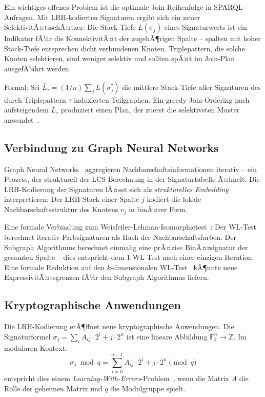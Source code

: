 ﻿\documentclass[a4paper,12pt]{article}
\theoremstyle{definition}
\begin{document}
Ein wichtiges offenes Problem ist die optimale Join-Reihenfolge in SPARQL-Anfragen.
Mit LRH-kodierten Signaturen ergibt sich ein neuer SelektivitÃ¤tsschÃ¤tzer: Die
Stack-Tiefe $L(\sigma_j)$ eines Signaturwerts ist ein Indikator fÃ¼r die KonnektivitÃ¤t
der zugehÃ¶rigen Spalte -- spalten mit hoher Stack-Tiefe entsprechen dicht verbundenen
Knoten. Triplepattern, die solche Knoten selektieren, sind weniger selektiv und
sollten spÃ¤t im Join-Plan ausgefÃ¼hrt werden.

Formal: Sei $\bar{L}_\tau = (1/n) \sum_j L(\sigma_j^\tau)$ die mittlere Stack-Tiefe
aller Signaturen des durch Triplepattern $\tau$ induzierten Teilgraphen. Ein greedy
Join-Ordering nach aufsteigendem $\bar{L}_\tau$ produziert einen Plan, der zuerst
die selektivsten Muster anwendet~\cite{stocker2008,neumann2009}.

\subsection{Verbindung zu Graph Neural Networks}

Graph Neural Networks~\cite{kipf2017,velickovic2018} aggregieren Nachbarschafts\-informationen
iterativ -- ein Prozess, der strukturell der LCS-Berechnung in der Signaturtabelle
Ã¤hnelt. Die LRH-Kodierung der Signaturen lÃ¤sst sich als \emph{strukturelles Embedding}
interpretieren: Der LRH-Stack einer Spalte $j$ kodiert die lokale Nachbarschaftsstruktur
des Knotens $v_j$ in binÃ¤rer Form.

Eine formale Verbindung zum Weisfeiler-Lehman-Isomorphietest~\cite{weisfeiler1968}:
Der WL-Test berechnet iterativ Farbsignaturen als Hash der Nachbarschaftsfarben.
Der Subgraph Algorithmus berechnet einmalig eine prÃ¤zise BinÃ¤rsignatur der gesamten
Spalte -- dies entspricht dem 1-WL-Test nach einer einzigen Iteration.
Eine formale Reduktion auf den $k$-dimensionalen WL-Test~\cite{azizian2020} kÃ¶nnte
neue ExpressivitÃ¤tsgrenzen fÃ¼r den Subgraph Algorithmus liefern.

\subsection{Kryptographische Anwendungen}

Die LRH-Kodierung erÃ¶ffnet neue kryptographische Anwendungen. Die Signaturformel
$\sigma_j = \sum_{i} A_{ij} \cdot 2^i + j \cdot 2^n$ ist eine lineare Abbildung
$\mathbb{F}_2^n \to \mathbb{Z}$. Im modularen Kontext:
\[
  \sigma_j \bmod q = \sum_{i=0}^{n-1} A_{ij} \cdot 2^i + j \cdot 2^n \pmod{q}
\]
entspricht dies einem \emph{Learning-With-Errors}-Problem~\cite{regev2009}, wenn
die Matrix $A$ die Rolle der geheimen Matrix und $q$ die Modulgruppe spielt.
\end{document}

